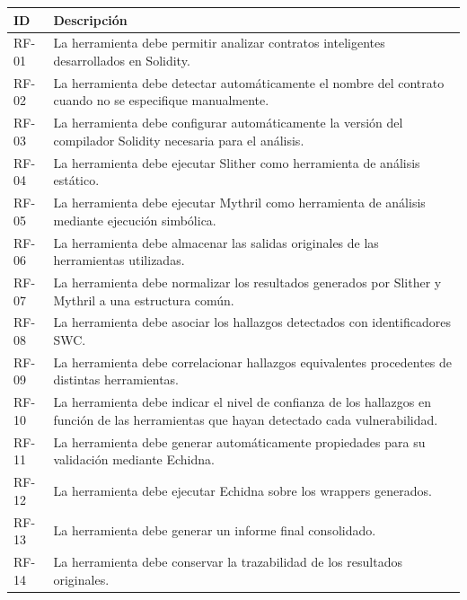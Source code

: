 {\def\LTcaptype{none} %
\begin{longtable}[]{@{}
  >{\raggedright\arraybackslash}p{}
  >{\raggedright\arraybackslash}p{}@{}}
\toprule\noalign{}
\begin{minipage}[b]{\linewidth}\raggedright
ID
\end{minipage} & \begin{minipage}[b]{\linewidth}\raggedright
Descripción
\end{minipage} \\
\midrule\noalign{}
\endhead
\bottomrule\noalign{}
\endlastfoot
RF-01 & La herramienta debe permitir analizar contratos inteligentes
desarrollados en Solidity. \\
RF-02 & La herramienta debe detectar automáticamente el nombre del
contrato cuando no se especifique manualmente. \\
RF-03 & La herramienta debe configurar automáticamente la versión del
compilador Solidity necesaria para el análisis. \\
RF-04 & La herramienta debe ejecutar Slither como herramienta de
análisis estático. \\
RF-05 & La herramienta debe ejecutar Mythril como herramienta de
análisis mediante ejecución simbólica. \\
RF-06 & La herramienta debe almacenar las salidas originales de las
herramientas utilizadas. \\
RF-07 & La herramienta debe normalizar los resultados generados por
Slither y Mythril a una estructura común. \\
RF-08 & La herramienta debe asociar los hallazgos detectados con
identificadores SWC. \\
RF-09 & La herramienta debe correlacionar hallazgos equivalentes
procedentes de distintas herramientas. \\
RF-10 & La herramienta debe indicar el nivel de confianza de los
hallazgos en función de las herramientas que hayan detectado cada
vulnerabilidad. \\
RF-11 & La herramienta debe generar automáticamente propiedades para su
validación mediante Echidna. \\
RF-12 & La herramienta debe ejecutar Echidna sobre los wrappers
generados. \\
RF-13 & La herramienta debe generar un informe final consolidado. \\
RF-14 & La herramienta debe conservar la trazabilidad de los resultados
originales. \\
\end{longtable}
}

